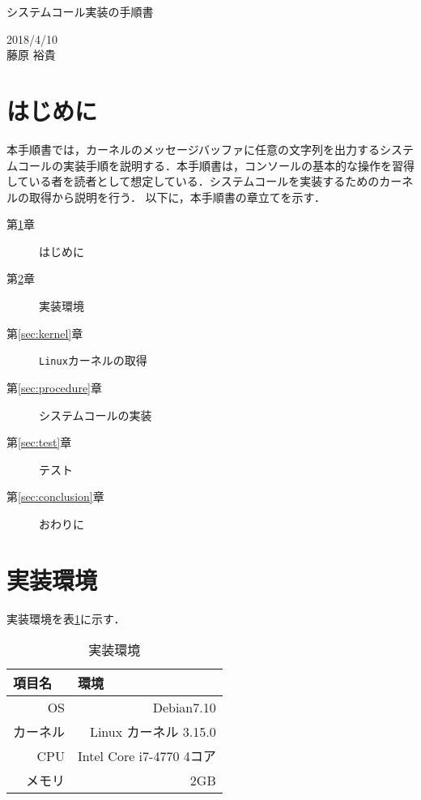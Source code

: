 \documentclass[12pt]{jsarticle}
\begin{document}
\begin{center}
{\LARGE システムコール実装の手順書}
\end{center}

\begin{flushright}
  2018/4/10\\
 藤原 裕貴
\end{flushright}
\section{はじめに}\label{sec:introduction}
本手順書では，カーネルのメッセージバッファに任意の文字列を出力するシステムコールの実装手順を説明する．本手順書は，コンソールの基本的な操作を習得している者を読者として想定している．システムコールを実装するためのカーネルの取得から説明を行う．
以下に，本手順書の章立てを示す．

\begin{description}
\item [第\ref{sec:introduction}章] はじめに
\item [第\ref{sec:env}章] 実装環境
\item [第\ref{sec:kernel}章] \verb|Linux|カーネルの取得
\item [第\ref{sec:procedure}章] システムコールの実装
\item [第\ref{sec:test}章] テスト
\item [第\ref{sec:conclusion}章] おわりに



\end{description}

\section{実装環境}\label{sec:env}
実装環境を表\ref{tab:env}に示す．

\begin{table}[h]
  \begin{center}
    \caption{実装環境}\label{tab:env}
    \begin{tabular}{r|r}
      \hline\hline
      \multicolumn{1}{l|}{項目名} & \multicolumn{1}{l}{環境} \\
      \hline
      OS & Debian7.10 \\
      カーネル & Linux カーネル 3.15.0 \\
      CPU & Intel Core i7-4770 4コア\\
      メモリ & 2GB \\
      \hline
    \end{tabular}
  \end{center}
\end{table}
\end{document}
